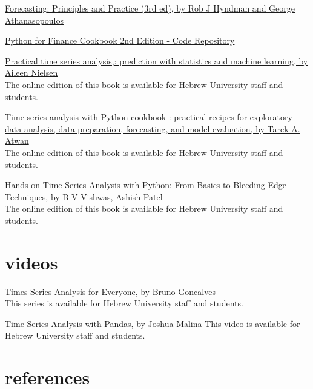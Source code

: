\documentclass[
  letterpaper,
  DIV=11,
  numbers=noendperiod,
  oneside]{scrreprt}
\begin{document}
\href{https://otexts.com/fpp3/}{Forecasting: Principles and Practice
(3rd ed), by Rob J Hyndman and George Athanasopoulos}

\href{https://github.com/erykml/Python-for-Finance-Cookbook-2E}{Python
for Finance Cookbook 2nd Edition - Code Repository}

\href{https://huji.primo.exlibrisgroup.com/permalink/972HUJI_INST/10ptda2/alma9920842016603701}{Practical
time series analysis,: prediction with statistics and machine learning,
by Aileen Nielsen}\\
The online edition of this book is available for Hebrew University staff
and students.

\href{https://huji.primo.exlibrisgroup.com/permalink/972HUJI_INST/10ptda2/alma9921049267803701}{Time
series analysis with Python cookbook : practical recipes for exploratory
data analysis, data preparation, forecasting, and model evaluation, by
Tarek A. Atwan}\\
The online edition of this book is available for Hebrew University staff
and students.

\href{https://huji.primo.exlibrisgroup.com/permalink/972HUJI_INST/10ptda2/alma9920845706703701}{Hands-on
Time Series Analysis with Python: From Basics to Bleeding Edge
Techniques, by B V Vishwas, Ashish Patel}\\
The online edition of this book is available for Hebrew University staff
and students.

\hypertarget{videos}{%
\section*{videos}\label{videos}}


\href{https://learning.oreilly.com/videos/times-series-analysis/9780136944515/}{Times
Series Analysis for Everyone, by Bruno Goncalves}\\
This series is available for Hebrew University staff and students.

\href{https://learning.oreilly.com/videos/time-series-analysis/00000G9DZPO7DJKE/}{Time
Series Analysis with Pandas, by Joshua Malina} This video is available
for Hebrew University staff and students.

\hypertarget{references}{%
\section*{references}\label{references}}
\end{document}

